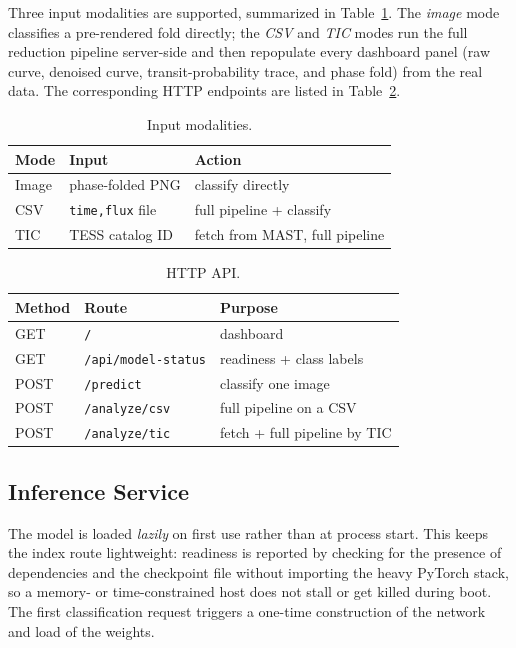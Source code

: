\documentclass[twocolumn,10pt]{article}
\newcommand{\code}[1]{\texttt{\small #1}}
\begin{document}
Three input modalities are supported, summarized in Table~\ref{tab:modes}. The
\emph{image} mode classifies a pre-rendered fold directly; the \emph{CSV} and
\emph{TIC} modes run the full reduction pipeline server-side and then repopulate
every dashboard panel (raw curve, denoised curve, transit-probability trace, and
phase fold) from the real data. The corresponding HTTP endpoints are listed in
Table~\ref{tab:api}.

\begin{table}[t]
\centering
\caption{Input modalities.}
\label{tab:modes}
\small
\begin{tabular}{@{}p{}p{}p{}@{}}
\toprule
\textbf{Mode} & \textbf{Input} & \textbf{Action} \\
\midrule
Image & phase-folded PNG & classify directly \\
CSV   & \code{time,flux} file & full pipeline + classify \\
TIC   & TESS catalog ID & fetch from MAST, full pipeline \\
\bottomrule
\end{tabular}
\end{table}

\begin{table}[t]
\centering
\caption{HTTP API.}
\label{tab:api}
\small
\begin{tabular}{@{}llp{}@{}}
\toprule
\textbf{Method} & \textbf{Route} & \textbf{Purpose} \\
\midrule
GET  & \code{/} & dashboard \\
GET  & \code{/api/model-status} & readiness + class labels \\
POST & \code{/predict} & classify one image \\
POST & \code{/analyze/csv} & full pipeline on a CSV \\
POST & \code{/analyze/tic} & fetch + full pipeline by TIC \\
\bottomrule
\end{tabular}
\end{table}

\subsection{Inference Service}
The model is loaded \emph{lazily} on first use rather than at process start. This
keeps the index route lightweight: readiness is reported by checking for the
presence of dependencies and the checkpoint file without importing the heavy
PyTorch stack, so a memory- or time-constrained host does not stall or get killed
during boot. The first classification request triggers a one-time construction of
the network and load of the weights.
\end{document}
